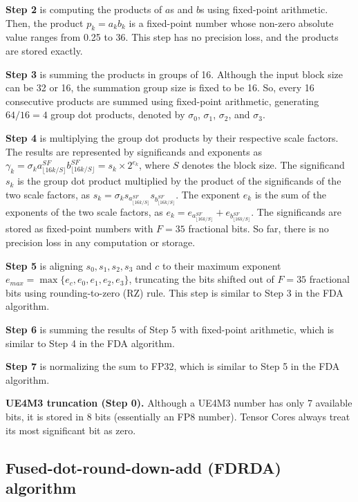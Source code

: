 \textbf{Step 2} is computing the products of $a$s and $b$s using fixed-point arithmetic. Then, the product $p_k=a_kb_k$ is a fixed-point number whose non-zero absolute value ranges from 0.25 to 36. This step has no precision loss, and the products are stored exactly.

\textbf{Step 3} is summing the products in groups of 16. Although the input block size can be 32 or 16, the summation group size is fixed to be 16. So, every 16 consecutive products are summed using fixed-point arithmetic, generating $64/16=4$ group dot products, denoted by $\sigma_0$, $\sigma_1$, $\sigma_2$, and $\sigma_3$.

\textbf{Step 4} is multiplying the group dot products by their respective scale factors. The results are represented by significands and exponents as $\gamma_k=\sigma_k a^{SF}_{\lfloor 16k/S\rfloor}b^{SF}_{\lfloor 16k/S\rfloor}=s_k\times 2^{e_k}$, where $S$ denotes the block size. The significand $s_k$ is the group dot product multiplied by the product of the significands of the two scale factors, as $s_k=\sigma_ks_{a^{SF}_{\lfloor 16k/S\rfloor}}s_{b^{SF}_{\lfloor 16k/S\rfloor}}$. The exponent $e_k$ is the sum of the exponents of the two scale factors, as $e_k = e_{a^{SF}_{\lfloor 16k/S\rfloor}}+e_{b^{SF}_{\lfloor 16k/S\rfloor}}$. The significands are stored as fixed-point numbers with $F=35$ fractional bits. So far, there is no precision loss in any computation or storage.

\textbf{Step 5} is aligning $s_0, s_1, s_2, s_3$ and $c$ to their maximum exponent $e_{max}=\max \{e_c, e_0, e_1, e_2, e_3\}$, truncating the bits shifted out of $F=35$ fractional bits using rounding-to-zero (RZ) rule. This step is similar to Step 3 in the FDA algorithm.

\textbf{Step 6} is summing the results of Step 5 with fixed-point arithmetic, which is similar to Step 4 in the FDA algorithm.

\textbf{Step 7} is normalizing the sum to FP32, which is similar to Step 5 in the FDA algorithm.

\textbf{UE4M3 truncation (Step 0).} Although a UE4M3 number has only 7 available bits, it is stored in 8 bits (essentially an FP8 number). Tensor Cores always treat its most significant bit as zero.


\subsection{Fused-dot-round-down-add (FDRDA) algorithm}

